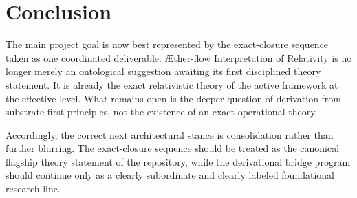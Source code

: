 \documentclass[11pt]{article}
\newcommand{\Aflow}{\AE{}ther-flow}
\newcommand{\TheoryName}{\Aflow{} Interpretation of Relativity}
\begin{document}
\section{Conclusion}

The main project goal is now best represented by the exact-closure sequence taken as one coordinated deliverable. \TheoryName{} is no longer merely an ontological suggestion awaiting its first disciplined theory statement. It is already the exact relativistic theory of the active framework at the effective level. What remains open is the deeper question of derivation from substrate first principles, not the existence of an exact operational theory.

Accordingly, the correct next architectural stance is consolidation rather than further blurring. The exact-closure sequence should be treated as the canonical flagship theory statement of the repository, while the derivational bridge program should continue only as a clearly subordinate and clearly labeled foundational research line.
\end{document}
